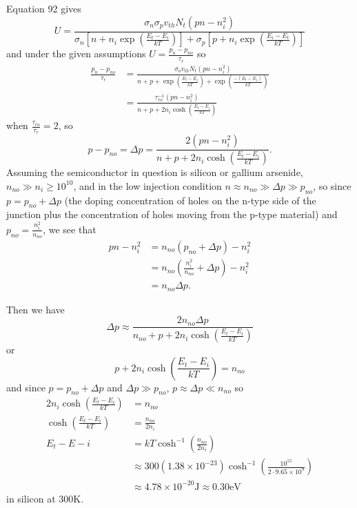 \documentclass{article}
\begin{document}
Equation 92 gives
$$
U = \frac{\sigma_n \sigma_p v_{th} N_t (pn - n_i^2)}
         {\sigma_n [n + n_i \exp \left(\frac{E_t - E_i}{kT}\right)]
        + \sigma_p [p + n_i \exp \left(\frac{E_i - E_t}{kT}\right)]}
$$
and under the given assumptions $U = \frac{p_n - p_{no}}{\tau_r}$ so
\begin{align*}
\frac{p_n - p_{no}}{\tau_r} 
  &= \frac{\sigma_o v_{th} N_t (pn - n_i^2)}
         {n + p + \exp\left(\frac{E_t - E_i}{kT}\right)
                + \exp\left(\frac{-(E_t - E_i)}{kT}\right)} \\
  &= \frac{\tau_{ro}^{-1} (pn - n_i^2)}
          {n + p + 2n_i \cosh \left(\frac{E_t - E_i}{kT}\right)}
\end{align*}
when $\frac{\tau_{ro}}{\tau_{r}} = 2$, so
$$
p - p_{no} = \Delta p 
           = \frac{2 (pn - n_i^2)}
                  {n + p + 2n_i \cosh \left(\frac{E_t - E_i}{kT}\right)}.
$$
Assuming the semiconductor in question is silicon or gallium arsenide,
$n_{no} \gg n_i \geq 10^{10}$, and in the low injection condition 
$n \approx n_{no} \gg \Delta p \gg p_{no}$, so since 
$p = p_{no} + \Delta p$ (the doping concentration of holes on the n-type
side of the junction plus the concentration of holes moving from the
p-type material) and $p_{no} = \frac{n_i^2}{n_{no}}$, we see that
\begin{align*}
pn - n_i^2 &= n_{no} (p_{no} + \Delta p) - n_i^2 \\
           &= n_{no} (\frac{n_i^2}{n_{no}} + \Delta p) - n_i^2 \\
           &= n_{no} \Delta p.
\end{align*}

Then we have
$$
\Delta p \approx \frac{2 n_{no} \Delta p}{n_{no} + p + 2n_i \cosh \left(\frac{E_t - E_i}{kT}\right)}
$$
or
$$
p + 2n_i \cosh \left(\frac{E_t - E_i}{kT}\right) = n_{no}
$$
and since $p = p_{no} + \Delta p$ and $\Delta p \gg p_{no}$, $p \approx \Delta p \ll n_{no}$ so
\begin{align*}
2 n_i \cosh\left(\frac{E_t - E_i}{kT}\right) &= n_{no} \\
\cosh\left(\frac{E_t - E_i}{kT}\right) &= \frac{n_{no}}{2 n_i} \\
E_t - E-i &= kT \cosh^{-1}\left(\frac{n_{no}}{2 n_i}\right) \\
  &\approx 300(1.38 \times 10^{-23})\cosh^{-1}\left(\frac{10^{15}}{2 \cdot 9.65 \times 10^9}\right) \\
  &\approx 4.78 \times 10^{-20} \mathrm{J} \approx 0.30 \mathrm{eV}
\end{align*}
in silicon at 300K.
\end{document}
